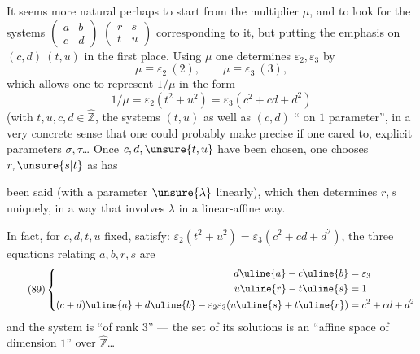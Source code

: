 It seems more natural perhaps to start from the multiplier $\mu$, and to
look for the systems
$\begin{pmatrix}a&b\\c&d\end{pmatrix}$
$\begin{pmatrix}r&s\\t&u\end{pmatrix}$ corresponding to it,
but putting the emphasis on $(c,d)\ (t,u)$ in the first place.
Using $\mu$ one determines $\varepsilon_2,\varepsilon_3$ by
\[
\mu\equiv\varepsilon_2\ (2),\qquad
\mu\equiv\varepsilon_3\ (3),
\]
 which allows one to  represent
$1/\mu$ in the form
\[
1/\mu=\varepsilon_2(t^2+u^2)=\varepsilon_3(c^2+cd+d^2)
\]
(with $t,u,c,d\in\widehat{\mathbb Z}$, the systems $(t,u)$ as well as
$(c,d)$ `` on $1$ parameter'', 
in a very concrete sense that one could probably make precise if one cared to,
explicit parameters  $\sigma,\tau$\ldots{} Once
$c,d,\unsure{t,u}$ have been chosen, one chooses $r,\unsure{s|t}$ as has



been said (with a parameter $\unsure{\lambda}$ 
linearly), which then determines $r,s$ uniquely, in a way
that involves $\lambda$  in a
linear-affine way.

In fact, for $c,d,t,u$ 
fixed, 
satisfy: $\varepsilon_2(t^2+u^2)=\varepsilon_3(c^2+cd+d^2)$,
the three equations relating $a,b,r,s$ are 
\[
\tag{89}
\left\{\begin{aligned}
d\uline{a}-c\uline{b}&=\varepsilon_3\\
u\uline{r}-t\uline{s}&=1\\
(c+d)\uline{a}+d\uline{b}
-\varepsilon_2\varepsilon_3(u\uline{s}+t\uline{r})&=c^2+cd+d^2
\end{aligned}\right.
\]
and the  system is ``of rank $3$''
--- the set of its solutions is an ``affine space of dimension $1$''
over $\widehat{\mathbb Z}$\ldots

